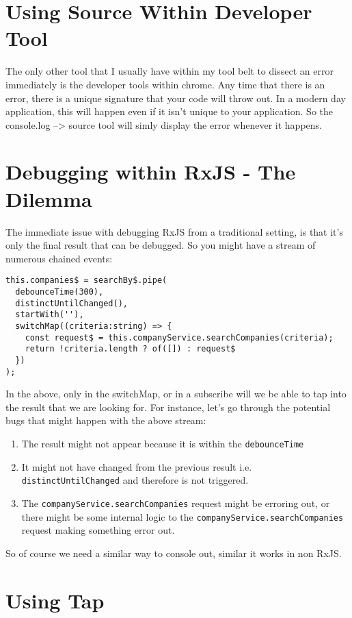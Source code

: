 
\section{Using Source Within Developer Tool}
The only other tool that I usually have within my tool belt to dissect an error immediately is the developer tools within chrome. Any time that there is an error, there is a unique signature that your code will throw out. In a modern day application, this will happen even if it isn't unique to your application. So the console.log --> source tool will simly display the error whenever it happens. 

\section{Debugging within RxJS - The Dilemma}
The immediate issue with debugging RxJS from a traditional setting, is that it's only the final result that can be debugged. So you might have a stream of numerous chained events: 
\begin{lstlisting}
this.companies$ = searchBy$.pipe(
  debounceTime(300),
  distinctUntilChanged(),
  startWith(''),      
  switchMap((criteria:string) => {
    const request$ = this.companyService.searchCompanies(criteria);
    return !criteria.length ? of([]) : request$          
  })
);  
\end{lstlisting}

In the above, only in the switchMap, or in a subscribe will we be able to tap into the result that we are looking for. For instance, let's go through the potential bugs that might happen with the above stream: 

\begin{enumerate}
  \item The result might not appear because it is within the \lstinline{debounceTime}
  \item It might not have changed from the previous result i.e. \lstinline{distinctUntilChanged} and therefore is not triggered.
  \item The \lstinline{companyService.searchCompanies} request might be erroring out, or there might be some internal logic to the \lstinline{companyService.searchCompanies} request making something error out.
\end{enumerate}

So of course we need a similar way to console out, similar it works in non RxJS. 

\section{Using Tap}